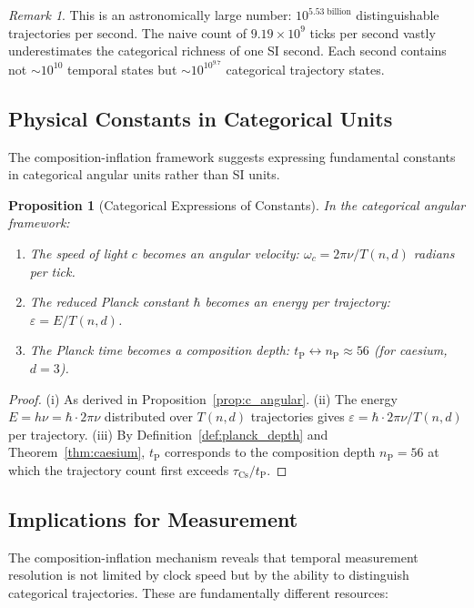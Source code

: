 \documentclass[twocolumn,10pt,a4paper]{article}
\newtheorem{proposition}[theorem]{Proposition}
\theoremstyle{definition}
\theoremstyle{remark}
\newtheorem{remark}[theorem]{Remark}
\newcommand{\tP}{t_{\mathrm{P}}}
\newcommand{\nP}{n_{\mathrm{P}}}
\begin{document}
\begin{remark}
This is an astronomically large number: $10^{5.53\;\text{billion}}$ distinguishable trajectories per second. The naive count of $9.19 \times 10^9$ ticks per second vastly underestimates the categorical richness of one SI second. Each second contains not $\sim 10^{10}$ temporal states but $\sim 10^{10^{9.7}}$ categorical trajectory states.
\end{remark}

\subsection{Physical Constants in Categorical Units}

The composition-inflation framework suggests expressing fundamental constants in categorical angular units rather than SI units.

\begin{proposition}[Categorical Expressions of Constants]
\label{prop:constants}
In the categorical angular framework:
\begin{enumerate}[label=(\roman*)]
\item The speed of light $c$ becomes an angular velocity: $\omega_c = 2\pi\nu / T(n,d)$ radians per tick.
\item The reduced Planck constant $\hbar$ becomes an energy per trajectory: $\varepsilon = E / T(n,d)$.
\item The Planck time becomes a composition depth: $\tP \leftrightarrow \nP \approx 56$ (for caesium, $d = 3$).
\end{enumerate}
\end{proposition}

\begin{proof}
(i) As derived in Proposition~\ref{prop:c_angular}. (ii) The energy $E = h\nu = \hbar \cdot 2\pi\nu$ distributed over $T(n,d)$ trajectories gives $\varepsilon = \hbar \cdot 2\pi\nu / T(n,d)$ per trajectory. (iii) By Definition~\ref{def:planck_depth} and Theorem~\ref{thm:caesium}, $\tP$ corresponds to the composition depth $\nP = 56$ at which the trajectory count first exceeds $\tau_{\mathrm{Cs}}/\tP$.
\end{proof}

\subsection{Implications for Measurement}

The composition-inflation mechanism reveals that temporal measurement resolution is not limited by clock speed but by the ability to distinguish categorical trajectories. These are fundamentally different resources:
\end{document}
